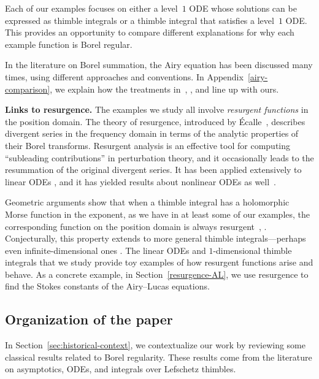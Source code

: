 \documentclass[pdftex]{sigma}
\numberwithin{equation}{section}
\begin{document}
Each of our examples focuses on either a level~$1$ ODE whose solutions can be expressed as thimble integrals or a thimble integral that satisfies a level~$1$ ODE. This provides an opportunity to compare different explanations for why each example function is Borel regular.

In the literature on Borel summation, the Airy equation has been discussed many times, using different approaches and conventions. In Appendix~\ref{airy-comparison}, we explain how the treatments in~\cite[Section 2.2]{lectures-Marino}, \cite[Section 6.14]{diverg-resurg-i}, and \cite[Section 2.2]{kawai-takei} line up with ours.

{\bf Links to resurgence.}
%
The examples we study all involve {\em resurgent functions} in the position domain. The theory of resurgence, introduced by \'Ecalle~\cite{EcalleI,EcalleII,EcalleIII}, describes divergent series in the frequency domain in terms of the analytic properties of their Borel transforms. Resurgent analysis is an effective tool for computing ``subleading contributions'' in perturbation theory, and it occasionally leads to the resummation of the original divergent series. It has been applied extensively to linear ODEs \cite{loday1994stokes,diverg-resurg--ii}, and it has yielded results about nonlinear ODEs as well~\cite{schiappa-PI,costin-PI,costin_kruskal,diverg-resurg-iii}.

Geometric arguments show that when a thimble integral has a holomorphic Morse function in the exponent, as we have in at least some of our examples, the corresponding function on the position domain is always resurgent~\cite{Maxim_slide_ERC}, \cite[Section~6.2]{kontsevich2022analyticity}. Conjecturally, this property extends to more general thimble integrals---perhaps even infinite-dimensional ones \cite[Examples~5--6]{Maxim_slide_ERC}. The linear ODEs and $1$-dimensional thimble integrals that we study provide toy examples of how resurgent functions arise and behave. As a concrete example, in Section~\ref{resurgence-AL}, we use resurgence to find the Stokes constants of the Airy--Lucas equations.
%
\subsection{Organization of the paper}\label{sec:org}
%
In Section~\ref{sec:historical-context}, we contextualize our work by reviewing some classical results related to Borel regularity. These results come from the literature on asymptotics, ODEs, and integrals over Lefschetz thimbles.
\end{document}
